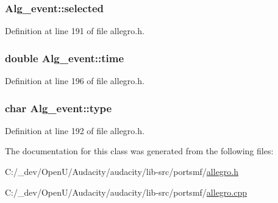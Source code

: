 \subsubsection[{\texorpdfstring{selected}{selected}}]{ Alg\+\_\+event\+::selected\hspace{0.3cm}{\ttfamily [protected]}}\hypertarget{class_alg__event_aa2f99bc020910867ebd30115c30c15e0}{}\label{class_alg__event_aa2f99bc020910867ebd30115c30c15e0}


Definition at line 191 of file allegro.\+h.

\subsubsection[{\texorpdfstring{time}{time}}]{\setlength{\rightskip}{0pt plus 5cm}double Alg\+\_\+event\+::time}\hypertarget{class_alg__event_a7d31289f03b355f25e0ddd4657783a13}{}\label{class_alg__event_a7d31289f03b355f25e0ddd4657783a13}


Definition at line 196 of file allegro.\+h.

\subsubsection[{\texorpdfstring{type}{type}}]{\setlength{\rightskip}{0pt plus 5cm}char Alg\+\_\+event\+::type\hspace{0.3cm}{\ttfamily [protected]}}\hypertarget{class_alg__event_a4643acd437fcf4232ee7eda633fa6ed5}{}\label{class_alg__event_a4643acd437fcf4232ee7eda633fa6ed5}


Definition at line 192 of file allegro.\+h.



The documentation for this class was generated from the following files\+:\begin{DoxyCompactItemize}
\item 
C\+:/\+\_\+dev/\+Open\+U/\+Audacity/audacity/lib-\/src/portsmf/\hyperlink{allegro_8h}{allegro.\+h}\item 
C\+:/\+\_\+dev/\+Open\+U/\+Audacity/audacity/lib-\/src/portsmf/\hyperlink{allegro_8cpp}{allegro.\+cpp}\end{DoxyCompactItemize}
